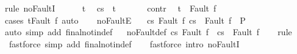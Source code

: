 \begin{isabellebody}
\ {\isacharparenleft}rule\ noFaultI{\isacharparenright}\isanewline
\ \ \ \ \isamarkupfalse%
\ t\ \isamarkupfalse%
\ {\isachardoublequoteopen}{\isasymGamma}{\isasymturnstile}{\isasymlangle}c{\isacharcomma}s{\isasymrangle}\ {\isasymRightarrow}\ t{\isachardoublequoteclose}\ \isanewline
\ \ \ \ \isamarkupfalse%
\ contr\ \isamarkupfalse%
\ {\isachardoublequoteopen}t\ {\isasymnoteq}\ Fault\ f{\isachardoublequoteclose}\isanewline
\ \ \ \ \ \ \isamarkupfalse%
\ {\isacharparenleft}cases\ {\isachardoublequoteopen}t{\isacharequal}Fault\ f{\isachardoublequoteclose}{\isacharparenright}\ auto\isanewline
\ \ \isamarkupfalse%
%
\endisatagproof
{\isafoldproof}%
%
\isadelimproof
\isanewline
%
\endisadelimproof
\isanewline
{}\isamarkupfalse%
\ noFaultE{\isacharcolon}\ \isanewline
\ \ {\isachardoublequoteopen}{\isasymlbrakk}{\isasymGamma}{\isasymturnstile}{\isasymlangle}c{\isacharcomma}s{\isasymrangle}\ {\isasymRightarrow}{\isasymnotin}{\isacharbraceleft}Fault\ f{\isacharbraceright}{\isacharsemicolon}\ {\isasymGamma}{\isasymturnstile}{\isasymlangle}c{\isacharcomma}s{\isasymrangle}\ {\isasymRightarrow}\ Fault\ f{\isasymrbrakk}\ {\isasymLongrightarrow}\ P{\isachardoublequoteclose}\isanewline
%
\isadelimproof
\ \ %
\endisadelimproof
%
\isatagproof
{}\isamarkupfalse%
\ {\isacharparenleft}auto\ simp\ add{\isacharcolon}\ final{\isacharunderscore}notin{\isacharunderscore}def{\isacharparenright}%
\endisatagproof
{\isafoldproof}%
%
\isadelimproof
\isanewline
%
\endisadelimproof
\ \isanewline
{}\isamarkupfalse%
\ noFault{\isacharunderscore}def{\isacharprime}{\isacharcolon}\ {\isachardoublequoteopen}{\isasymGamma}{\isasymturnstile}{\isasymlangle}c{\isacharcomma}s{\isasymrangle}\ {\isasymRightarrow}{\isasymnotin}{\isacharbraceleft}Fault\ f{\isacharbraceright}\ {\isacharequal}\ {\isacharparenleft}{\isasymnot}{\isasymGamma}{\isasymturnstile}{\isasymlangle}c{\isacharcomma}s{\isasymrangle}\ {\isasymRightarrow}\ Fault\ f{\isacharparenright}{\isachardoublequoteclose}\isanewline
%
\isadelimproof
\ \ %
\endisadelimproof
%
\isatagproof
{}\isamarkupfalse%
\ rule\isanewline
\ \ \isamarkupfalse%
\ \ {\isacharparenleft}fastforce\ simp\ add{\isacharcolon}\ final{\isacharunderscore}notin{\isacharunderscore}def{\isacharparenright}\isanewline
\ \ \isamarkupfalse%
\ {\isacharparenleft}fastforce\ intro{\isacharcolon}\ noFaultI{\isacharprime}{\isacharparenright}\isanewline
\ \ \isamarkupfalse%
%

\end{isabellebody}
